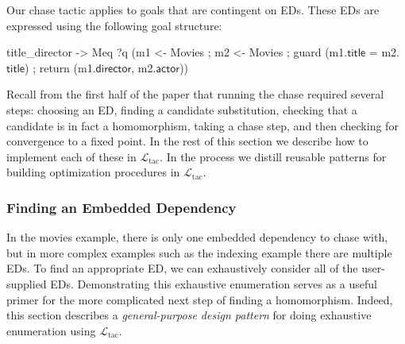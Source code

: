 \documentclass[preprint]{sigplanconf}
\newcommand{\WHERE}{{\tt where}\relax\ifmmode\ \else\xspace\fi}
\newcommand{\ltac}[0]{\ensuremath{\mathcal{L}_{\mathrm{tac}}}}
\begin{document}
Our chase tactic applies to goals that are contingent on EDs.
These EDs are expressed using the following goal structure:
\begin{coq}
title_director ->
Meq ?q
    (m1 <- Movies ; m2 <- Movies ;
     guard (m1.$\textsf{title}$ = m2.$\textsf{title}$) ;
     return (m1.$\textsf{director}$, m2.$\textsf{actor}$))
\end{coq}

Recall from the first half of the paper that running the chase required several steps: choosing an ED, finding a candidate substitution, checking that a candidate is in fact a homomorphism, taking a chase step, and then checking for convergence to a fixed point.
In the rest of this section we describe how to implement each of these in \ltac{}.
In the process we distill reusable patterns for building optimization procedures in \ltac.



\subsubsection{Finding an Embedded Dependency}
\label{sec:traverse-ed}

In the movies example, there is only one embedded dependency to chase with, but in more complex examples such as the indexing example there are multiple EDs.
To find an appropriate ED, we can exhaustively consider all of the user-supplied EDs.
Demonstrating this exhaustive enumeration serves as a useful primer for the more complicated next step of finding a homomorphism.
Indeed, this section describes a \emph{general-purpose design pattern} for doing exhaustive enumeration using \ltac{}.
\end{document}
